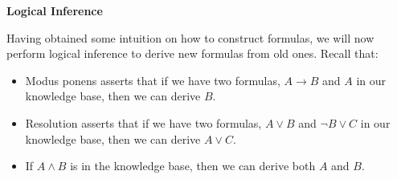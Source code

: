 \item {\bf Logical Inference}

Having obtained some intuition on how to construct formulas, we will now perform
logical inference to derive new formulas from old ones. Recall that:
\begin{itemize}
  \item Modus ponens asserts that if we have two formulas, $A \to B$ and $A$ in
  our knowledge base, then we can derive $B$.
  \item Resolution asserts that if we have two formulas, $A \vee B$ and $\neg B
  \vee C$ in our knowledge base, then we can derive $A \vee C$.
  \item If $A \wedge B$ is in the knowledge base, then we can derive both $A$
  and $B$.
\end{itemize}

\begin{enumerate}

  

  

  

  

\end{enumerate}

